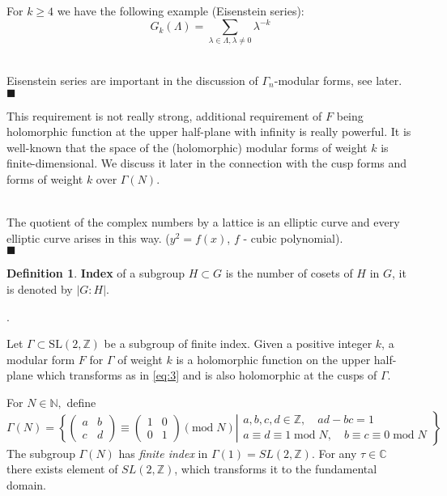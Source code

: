 \documentclass[a4paper,12pt]{article}
\newenvironment{comment}
{\par\noindent{\bf Comment}\\}
{\\\hfill$\scriptstyle\blacksquare$\par}
\theoremstyle{definition} \newtheorem{Def}{Definition}
\begin{document}
For $k\geq 4$ we have the following example (Eisenstein series):
\begin{equation}
  \label{eq:5}
  G_k(\Lambda)=\sum_{\lambda\in \Lambda, \lambda\neq 0} \lambda^{-k}
\end{equation}
\begin{comment}
Eisenstein series are important in the discussion of $\Gamma_n$-modular forms, see later.
\end{comment}

This requirement is not really strong, additional requirement of $F$ being holomorphic function at the upper half-plane with infinity is really powerful. It is well-known that the space of the (holomorphic) modular forms of weight $k$ is finite-dimensional. We discuss it later in the connection with the cusp forms and forms of weight $k$ over $\Gamma(N)$.

\begin{comment}
The quotient of the complex numbers by a lattice is an elliptic curve and every elliptic curve arises in this way. ($y^2=f(x)$, $f$ - cubic polynomial).  
\end{comment}

\begin{Def}
  {\bf Index} of a subgroup $H\subset G$ is the number of cosets of $H$ in $G$, it is denoted by $\left|G:H\right|$.
\end{Def}.

Let $\Gamma \subset \mathrm{SL}(2,\mathbb{Z})$ be a subgroup of finite index. Given a positive integer $k$, a modular form $F$ for $\Gamma$ of weight $k$ is a holomorphic function on the upper half-plane which transforms as in \eqref{eq:3} and is also holomorphic at the cusps of $\Gamma$. 

For $N\in \mathbb{N},$ define
\begin{equation}
  \label{eq:12}
  \Gamma(N)=\left\{
      \begin{pmatrix} a & b \\ c & d
      \end{pmatrix}
      \equiv
      \begin{pmatrix}
        1 & 0 \\
        0 & 1
      \end{pmatrix} (\text{mod}\; N)
      \right|\left.
        \begin{matrix}
          a,b,c,d\in \mathbb{Z},\quad ad-bc=1\\
          a\equiv d\equiv 1\; \text{mod}\; N,\quad b\equiv c\equiv 0\; \text{mod}\; N
        \end{matrix}
      \right\}
  \end{equation}
The subgroup $\Gamma(N)$ has {\it finite index} in $\Gamma(1)=SL(2,\mathbb{Z})$. For any $\tau\in \mathbb{C}$ there exists element of $SL(2,\mathbb{Z})$, which transforms it to the fundamental domain.
\end{document}
